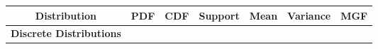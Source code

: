 \documentclass[11pt]{article}
\begin{document}
\begin{tabular}{|c|c|c|c|c|c|c|}
\hline
{\bf Distribution} & {\bf PDF} & {\bf CDF} & {\bf Support} & {\bf Mean} & {\bf Variance} & {\bf MGF} \\
\hline
{\bf Discrete Distributions}
\end{tabular}
\end{document}
